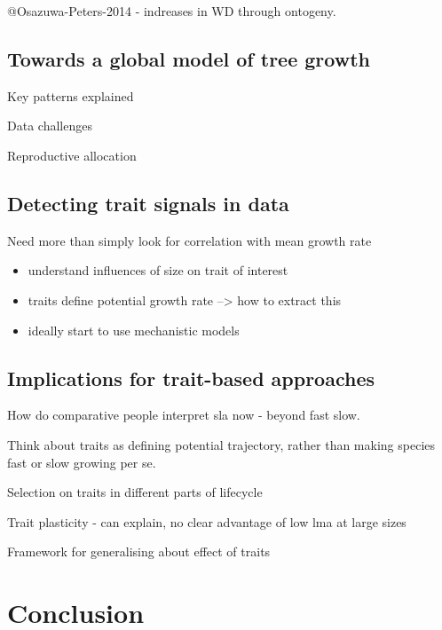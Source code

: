 \documentclass[12pt, a4paper]{article}
\begin{document}
@Osazuwa-Peters-2014 - indreases in WD through ontogeny.

\subsection*{Towards a global model of tree
growth}\label{towards-a-global-model-of-tree-growth}

Key patterns explained

Data challenges

Reproductive allocation

\subsection*{Detecting trait signals in
data}\label{detecting-trait-signals-in-data}

Need more than simply look for correlation with mean growth rate

\begin{itemize}
\itemsep1pt\parskip0pt
\item
  understand influences of size on trait of interest
\item
  traits define potential growth rate --\textgreater{} how to extract
  this
\item
  ideally start to use mechanistic models
\end{itemize}

\subsection*{Implications for trait-based
approaches}\label{implications-for-trait-based-approaches}

How do comparative people interpret sla now - beyond fast slow.

Think about traits as defining potential trajectory, rather than making
species fast or slow growing per se.

Selection on traits in different parts of lifecycle

Trait plasticity - can explain, no clear advantage of low lma at large
sizes

Framework for generalising about effect of traits

\section*{Conclusion}\label{conclusion}

\newpage
\end{document}
